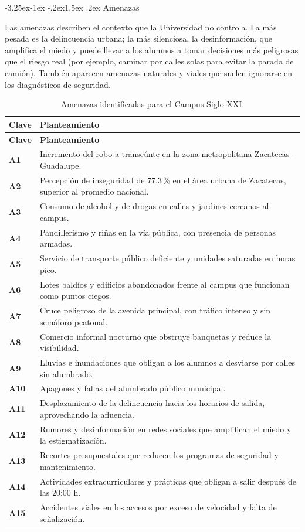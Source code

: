 \documentclass[11pt,a4paper]{article}
\makeatletter
\renewcommand\subsection{\@startsection{subsection}{2}{\z@}%
  {-3.25ex\@plus -1ex \@minus -.2ex}{1.5ex \@plus .2ex}%
  {\normalfont\large\bfseries\color{uazblue!85!black}}}
\newcommand{\clave}[1]{\textbf{\color{uazblue}#1}}
\makeatother
\begin{document}
\subsection{Amenazas}

Las amenazas describen el contexto que la Universidad no controla. La más
pesada es la delincuencia urbana; la más silenciosa, la desinformación, que
amplifica el miedo y puede llevar a los alumnos a tomar decisiones más
peligrosas que el riesgo real (por ejemplo, caminar por calles solas para
evitar la parada de camión). También aparecen amenazas naturales y viales que
suelen ignorarse en los diagnósticos de seguridad.

{\small\singlespacing
\begin{longtable}{@{}L{1.25cm}L{13.9cm}@{}}
\caption{Amenazas identificadas para el Campus Siglo XXI.}
\label{tab:amenazas}\\
\toprule
\textbf{Clave} & \textbf{Planteamiento} \\
\midrule
\endfirsthead
\toprule
\textbf{Clave} & \textbf{Planteamiento} \\
\midrule
\endhead
\bottomrule
\endfoot
\bottomrule
\endlastfoot
\clave{A1}  & Incremento del robo a transeúnte en la zona metropolitana Zacatecas--Guadalupe. \\
\clave{A2}  & Percepción de inseguridad de 77.3\,\% en el área urbana de Zacatecas, superior al promedio nacional. \\
\clave{A3}  & Consumo de alcohol y de drogas en calles y jardines cercanos al campus. \\
\clave{A4}  & Pandillerismo y riñas en la vía pública, con presencia de personas armadas. \\
\clave{A5}  & Servicio de transporte público deficiente y unidades saturadas en horas pico. \\
\clave{A6}  & Lotes baldíos y edificios abandonados frente al campus que funcionan como puntos ciegos. \\
\clave{A7}  & Cruce peligroso de la avenida principal, con tráfico intenso y sin semáforo peatonal. \\
\clave{A8}  & Comercio informal nocturno que obstruye banquetas y reduce la visibilidad. \\
\clave{A9}  & Lluvias e inundaciones que obligan a los alumnos a desviarse por calles sin alumbrado. \\
\clave{A10} & Apagones y fallas del alumbrado público municipal. \\
\clave{A11} & Desplazamiento de la delincuencia hacia los horarios de salida, aprovechando la afluencia. \\
\clave{A12} & Rumores y desinformación en redes sociales que amplifican el miedo y la estigmatización. \\
\clave{A13} & Recortes presupuestales que reducen los programas de seguridad y mantenimiento. \\
\clave{A14} & Actividades extracurriculares y prácticas que obligan a salir después de las 20:00 h. \\
\clave{A15} & Accidentes viales en los accesos por exceso de velocidad y falta de señalización. \\
\end{longtable}}
\end{document}
